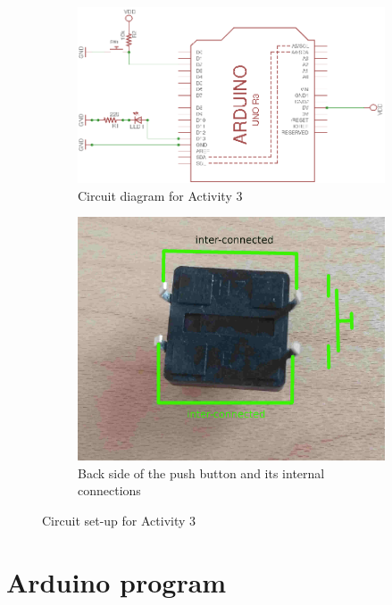 \documentclass[12pt]{book}
\begin{document}
\begin{figure}[tb]
	 \centering
  \begin{subfigure}[b]{0.65 \textwidth}
	\includegraphics[width=\textwidth]{schem/Experiment3}
	\caption{Circuit diagram for Activity 3}
	\label{fig:SchemEx2}
  \end{subfigure}
\hfill
  \begin{subfigure}[b]{0.3 \textwidth}
  \includegraphics[width=\textwidth]{schem/button2.jpg}
  \caption{Back side of the push button and its internal
    connections}\label{fig:button} 
  \end{subfigure}
  \caption{Circuit set-up for Activity 3}\label{fig:setup2}
\end{figure}


\section{Arduino program}
\end{document}
